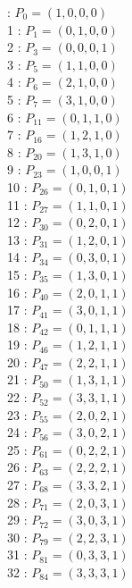 \documentclass{article}
\begin{document}
{\begin{multicols}{3}
 : $P_{0}=( 1, 0, 0, 0 )$\\
1 : $P_{1}=( 0, 1, 0, 0 )$\\
2 : $P_{3}=( 0, 0, 0, 1 )$\\
3 : $P_{5}=( 1, 1, 0, 0 )$\\
4 : $P_{6}=( 2, 1, 0, 0 )$\\
5 : $P_{7}=( 3, 1, 0, 0 )$\\
6 : $P_{11}=( 0, 1, 1, 0 )$\\
7 : $P_{16}=( 1, 2, 1, 0 )$\\
8 : $P_{20}=( 1, 3, 1, 0 )$\\
9 : $P_{23}=( 1, 0, 0, 1 )$\\
10 : $P_{26}=( 0, 1, 0, 1 )$\\
11 : $P_{27}=( 1, 1, 0, 1 )$\\
12 : $P_{30}=( 0, 2, 0, 1 )$\\
13 : $P_{31}=( 1, 2, 0, 1 )$\\
14 : $P_{34}=( 0, 3, 0, 1 )$\\
15 : $P_{35}=( 1, 3, 0, 1 )$\\
16 : $P_{40}=( 2, 0, 1, 1 )$\\
17 : $P_{41}=( 3, 0, 1, 1 )$\\
18 : $P_{42}=( 0, 1, 1, 1 )$\\
19 : $P_{46}=( 1, 2, 1, 1 )$\\
20 : $P_{47}=( 2, 2, 1, 1 )$\\
21 : $P_{50}=( 1, 3, 1, 1 )$\\
22 : $P_{52}=( 3, 3, 1, 1 )$\\
23 : $P_{55}=( 2, 0, 2, 1 )$\\
24 : $P_{56}=( 3, 0, 2, 1 )$\\
25 : $P_{61}=( 0, 2, 2, 1 )$\\
26 : $P_{63}=( 2, 2, 2, 1 )$\\
27 : $P_{68}=( 3, 3, 2, 1 )$\\
28 : $P_{71}=( 2, 0, 3, 1 )$\\
29 : $P_{72}=( 3, 0, 3, 1 )$\\
30 : $P_{79}=( 2, 2, 3, 1 )$\\
31 : $P_{81}=( 0, 3, 3, 1 )$\\
32 : $P_{84}=( 3, 3, 3, 1 )$\\
\end{multicols}


%


%


}%
\end{document}
